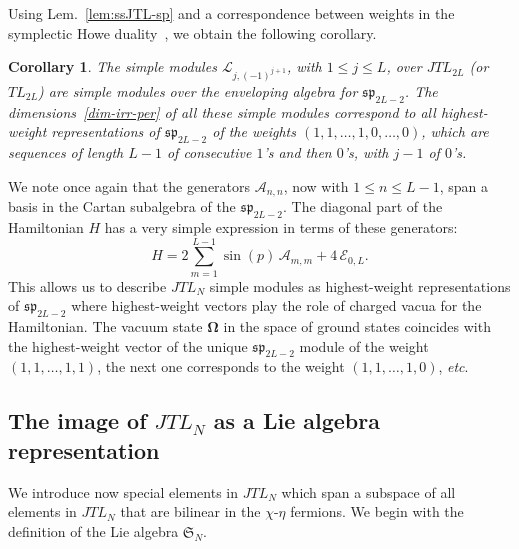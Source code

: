 \documentclass[11pt]{article}
\newcommand{\TL}[1]{TL_{#1}}
\newcommand{\JTL}[1]{JTL_{#1}}
\newcommand{\vac}{\boldsymbol{\Omega}}
\newcommand{\interLie}{\mathfrak{S}}
\newcommand{\interfin}[1]{\interLie_{#1}}
\newcommand{\Asp}{\mathcal{A}}
\newcommand{\Egl}{\mathcal{E}}
\newcommand{\ssp}{\mathfrak{sp}}
\newcommand{\AIrrTL}[2]{\mathscr{L}_{#1,#2}}
\newtheorem{cor}[subsubsection]{Corollary}
\theoremstyle{definition}
\begin{document}
Using Lem.~\ref{lem:ssJTL-sp} and a correspondence between weights in the symplectic Howe duality~\cite{H3,BrockerDieck}, we obtain the following  corollary.
\begin{cor}\label{cor:JTL-sp-simples}
The simple modules $\AIrrTL{j}{(-1)^{j+1}}$, with $1\leq j\leq L$, over $\JTL{2L}$ (or $\TL{2L}$) are simple
modules over the enveloping algebra for $\ssp_{2L-2}$. The dimensions~\eqref{dim-irr-per}
of all these simple modules correspond to all highest-weight
representations of $\ssp_{2L-2}$ of the weights $(1,1,\dots,1,0,\dots,0)$, which are  sequences of length $L-1$ of consecutive $1$'s and then $0$'s, with $j-1$ of $0$'s.
\end{cor}
We note once again that the generators $\Asp_{n,n}$, now with $1\leq n\leq L-1$, span a basis in the Cartan subalgebra of the  $\ssp_{2L-2}$.
The diagonal part of the Hamiltonian $H$ has a very simple expression in terms of these generators:
\begin{equation}
H= 2\sum_{m=1}^{L-1}
\sin{(p)}\, \Asp_{m,m} + 4\,\Egl_{0,L}.
\end{equation}
This allows us to describe $\JTL{N}$ simple modules as highest-weight representations of $\ssp_{2L-2}$ where highest-weight vectors play the role of charged vacua for the Hamiltonian. The vacuum state $\vac$ in the  space  of ground states coincides with the  highest-weight vector of the unique $\ssp_{2L-2}$ module of  the weight $(1,1,\dots,1,1)$, the next one corresponds to the weight $(1,1,\dots,1,0)$, \textit{etc}.


\subsection{The image  of $\JTL{N}$ as a Lie algebra representation}
We  introduce now special
elements  in $\JTL{N}$ which span a subspace of all elements in $\JTL{N}$
that are  bilinear in the $\chi$-$\eta$ fermions. We begin with the definition of the Lie algebra $\interfin{N}$.
\end{document}
